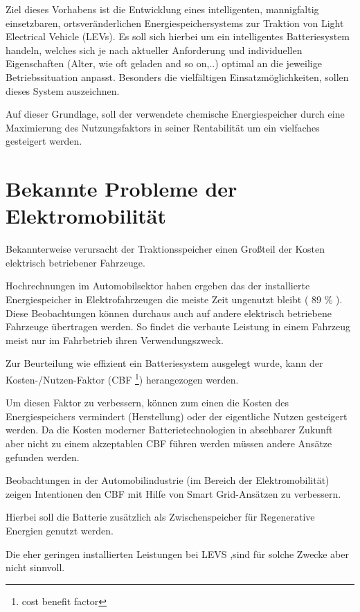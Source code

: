 Ziel dieses  Vorhabens ist die Entwicklung eines intelligenten, mannigfaltig einsetzbaren, ortsveränderlichen Energiespeichersystems zur Traktion von Light Electrical Vehicle (LEVs).
Es soll sich hierbei um ein intelligentes Batteriesystem handeln, welches sich je nach aktueller Anforderung und individuellen Eigenschaften (Alter, wie oft geladen and so on,..) optimal an die jeweilige Betriebssituation anpasst.
Besonders die vielfältigen Einsatzmöglichkeiten, sollen dieses System auszeichnen.

Auf dieser Grundlage, soll der verwendete chemische Energiespeicher durch eine Maximierung des Nutzungsfaktors in seiner Rentabilität um ein vielfaches gesteigert werden.

\section{Bekannte Probleme der Elektromobilität}

Bekannterweise verursacht der Traktionsspeicher einen Großteil der Kosten elektrisch betriebener Fahrzeuge.

Hochrechnungen im Automobilsektor haben ergeben das der installierte Energiespeicher in Elektrofahrzeugen die meiste Zeit ungenutzt bleibt ( 89 \% ). Diese Beobachtungen können durchaus auch auf andere elektrisch betriebene Fahrzeuge übertragen werden. So findet die verbaute Leistung in einem Fahrzeug meist nur im Fahrbetrieb ihren Verwendungszweck.

Zur Beurteilung wie effizient ein Batteriesystem ausgelegt wurde, kann der Kosten-/Nutzen-Faktor (CBF \footnote{cost benefit factor}) herangezogen werden.

Um diesen Faktor zu verbessern, können zum einen die Kosten des Energiespeichers vermindert (Herstellung)  oder der eigentliche Nutzen gesteigert werden.
Da die Kosten moderner Batterietechnologien in absehbarer Zukunft aber nicht zu einem akzeptablen CBF führen werden müssen andere Ansätze gefunden werden. 

Beobachtungen in der Automobilindustrie (im Bereich der Elektromobilität) zeigen Intentionen den CBF mit Hilfe von Smart Grid-Ansätzen  zu verbessern.

Hierbei soll die Batterie zusätzlich als Zwischenspeicher für Regenerative Energien genutzt werden.

Die eher geringen installierten Leistungen bei LEVS ,sind für solche Zwecke aber nicht sinnvoll. 

